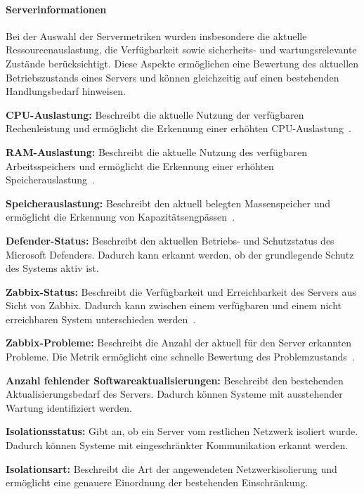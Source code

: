 \paragraph{Serverinformationen}
\label{par:server-values}

Bei der Auswahl der Servermetriken wurden insbesondere die aktuelle
Ressourcenauslastung, die Verfügbarkeit sowie sicherheits- und
wartungsrelevante Zustände berücksichtigt. Diese Aspekte ermöglichen
eine Bewertung des aktuellen Betriebszustands eines Servers und können
gleichzeitig auf einen bestehenden Handlungsbedarf hinweisen.

\begin{compactitem}

    \item \textbf{CPU-Auslastung:} Beschreibt die aktuelle Nutzung der
    verfügbaren Rechenleistung und ermöglicht die Erkennung einer
    erhöhten CPU-Auslastung~\cite{microsoft2026troubleshoot}.

    \item \textbf{RAM-Auslastung:} Beschreibt die aktuelle Nutzung des
    verfügbaren Arbeitsspeichers und ermöglicht die Erkennung einer
    erhöhten Speicherauslastung~\cite{microsoft2026troubleshoot}.

    \item \textbf{Speicherauslastung:} Beschreibt den aktuell belegten
    Massenspeicher und ermöglicht die Erkennung von
    Kapazitätsengpässen~\cite{microsoft2026troubleshoot}.

    \item \textbf{Defender-Status:} Beschreibt den aktuellen
    Betriebs- und Schutzstatus des Microsoft Defenders. Dadurch kann
    erkannt werden, ob der grundlegende Schutz des Systems aktiv ist.

    \item \textbf{Zabbix-Status:} Beschreibt die Verfügbarkeit und
    Erreichbarkeit des Servers aus Sicht von Zabbix. Dadurch kann
    zwischen einem verfügbaren und einem nicht erreichbaren System
    unterschieden werden~\cite{zabbix2026availability}.

    \item \textbf{Zabbix-Probleme:} Beschreibt die Anzahl der aktuell
    für den Server erkannten Probleme. Die Metrik ermöglicht eine
    schnelle Bewertung des Problemzustands~\cite{zabbix2026problemget}.

    \item \textbf{Anzahl fehlender Softwareaktualisierungen:}
    Beschreibt den bestehenden Aktualisierungsbedarf des Servers.
    Dadurch können Systeme mit ausstehender Wartung identifiziert
    werden.

    \item \textbf{Isolationsstatus:} Gibt an, ob ein Server vom
    restlichen Netzwerk isoliert wurde. Dadurch können Systeme mit
    eingeschränkter Kommunikation erkannt werden.

    \item \textbf{Isolationsart:} Beschreibt die Art der angewendeten
    Netzwerkisolierung und ermöglicht eine genauere Einordnung der
    bestehenden Einschränkung.

\end{compactitem}

